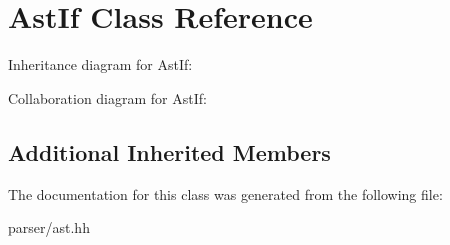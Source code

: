 \hypertarget{classAstIf}{}\section{Ast\+If Class Reference}
\label{classAstIf}


Inheritance diagram for Ast\+If\+:


Collaboration diagram for Ast\+If\+:
\subsection*{Additional Inherited Members}


The documentation for this class was generated from the following file\+:\begin{DoxyCompactItemize}
\item 
parser/ast.\+hh\end{DoxyCompactItemize}
